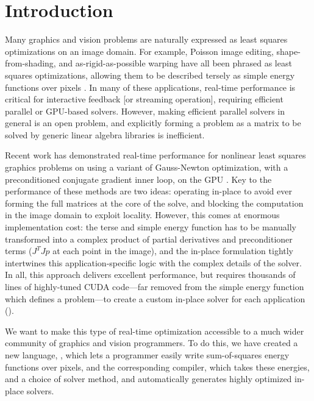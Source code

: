 \section{Introduction}
\label{sec:intro}

Many graphics and vision problems are naturally expressed as least squares optimizations on an image domain.
For example, Poisson image editing, shape-from-shading, and as-rigid-as-possible warping have all been phrased as least squares optimizations, allowing them to be described tersely as simple energy functions over pixels .
In many of these applications, real-time performance is critical for interactive feedback [or streaming operation], requiring efficient parallel or GPU-based solvers.
However, making efficient parallel solvers in general is an open problem, and explicitly forming a problem as a matrix to be solved by generic linear algebra libraries is inefficient.

Recent work has demonstrated real-time performance for nonlinear least squares graphics problems on using a variant of Gauss-Newton optimization, with a preconditioned conjugate gradient inner loop, on the GPU .
Key to the performance of these methods are two ideas: operating in-place to avoid ever forming the full matrices at the core of the solve, and blocking the computation in the image domain to exploit locality.
However, this comes at enormous implementation cost:
the terse and simple energy function has to be manually transformed into a complex product of partial derivatives and preconditioner terms ($J^TJp$ at each point in the image),
and the in-place formulation tightly intertwines this application-specific logic with the complex details of the solver.
In all, this approach delivers excellent performance, but requires thousands of lines of highly-tuned CUDA code—far removed from the simple energy function which defines a problem—to create a custom in-place solver for each application ().

We want to make this type of real-time optimization accessible to a much wider community of graphics and vision programmers.
To do this, we have
created a new language, \OPT, which lets a programmer easily write sum-of-squares energy functions over pixels,
and the corresponding compiler, which takes these energies, and a choice of solver method, and automatically generates highly optimized in-place solvers.

